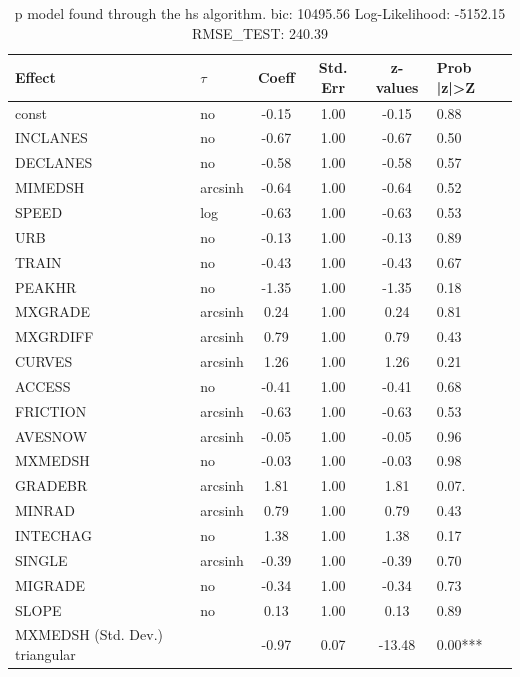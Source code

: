 \begin{table}
	\caption{p model found through the hs algorithm. bic: 10495.56 Log-Likelihood: -5152.15 RMSE_TEST: 240.39}
	\begin{center}
		\begin{tabular}{|l|l|c|c|c|l|}
			\hline
			Effect & $\tau$ & Coeff & Std. Err & z-values & Prob |z|>Z \\
			\hline
			const & no & -0.15 & 1.00 & -0.15 & 0.88 \\
			\hline
			INCLANES & no & -0.67 & 1.00 & -0.67 & 0.50 \\
			\hline
			DECLANES & no & -0.58 & 1.00 & -0.58 & 0.57 \\
			\hline
			MIMEDSH & arcsinh & -0.64 & 1.00 & -0.64 & 0.52 \\
			\hline
			SPEED & log & -0.63 & 1.00 & -0.63 & 0.53 \\
			\hline
			URB & no & -0.13 & 1.00 & -0.13 & 0.89 \\
			\hline
			TRAIN & no & -0.43 & 1.00 & -0.43 & 0.67 \\
			\hline
			PEAKHR & no & -1.35 & 1.00 & -1.35 & 0.18 \\
			\hline
			MXGRADE & arcsinh & 0.24 & 1.00 & 0.24 & 0.81 \\
			\hline
			MXGRDIFF & arcsinh & 0.79 & 1.00 & 0.79 & 0.43 \\
			\hline
			CURVES & arcsinh & 1.26 & 1.00 & 1.26 & 0.21 \\
			\hline
			ACCESS & no & -0.41 & 1.00 & -0.41 & 0.68 \\
			\hline
			FRICTION & arcsinh & -0.63 & 1.00 & -0.63 & 0.53 \\
			\hline
			AVESNOW & arcsinh & -0.05 & 1.00 & -0.05 & 0.96 \\
			\hline
			MXMEDSH & no & -0.03 & 1.00 & -0.03 & 0.98 \\
			\hline
			GRADEBR & arcsinh & 1.81 & 1.00 & 1.81 & 0.07. \\
			\hline
			MINRAD & arcsinh & 0.79 & 1.00 & 0.79 & 0.43 \\
			\hline
			INTECHAG & no & 1.38 & 1.00 & 1.38 & 0.17 \\
			\hline
			SINGLE & arcsinh & -0.39 & 1.00 & -0.39 & 0.70 \\
			\hline
			MIGRADE & no & -0.34 & 1.00 & -0.34 & 0.73 \\
			\hline
			SLOPE & no & 0.13 & 1.00 & 0.13 & 0.89 \\
			\hline
			MXMEDSH (Std. Dev.) triangular &  & -0.97 & 0.07 & -13.48 & 0.00*** \\

\end{tabular}
\end{center}
\end{table}
